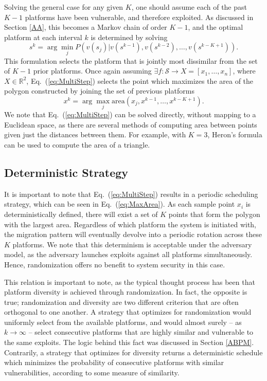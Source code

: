 \documentclass{acm_proc_article-sp}
\begin{document}
Solving the general case for any given $K$, one should assume each of the past $K-1$ platforms have been vulnerable, and therefore exploited. As discussed in Section \ref{AA}, this becomes a Markov chain of order $K-1$, and the optimal platform at each interval $k$ is determined by solving
\begin{equation}
s^k=\arg\min_{j}P\left(v(s_{j})|v(s^{k-1}),v(s^{k-2}),\ldots,v(s^{k-K+1})\right).\label{eq:MultiStep}
\end{equation}
This formulation selects the platform that is jointly most dissimilar from the set of $K-1$ prior platforms. Once again assuming $\exists f:\mathcal{S}\rightarrow X=[x_{1},\ldots,x_{n}]$, where $X\in\mathbb{R}^{2}$, Eq.\ (\ref{eq:MultiStep}) selects the point which maximizes the area of the polygon constructed by joining the set of previous platforms
\begin{equation}
x^k=\arg\max_{j}\textrm{area}(x_{j},x^{k-1},\ldots,x^{k-K+1}).\label{eq:MaxArea}
\end{equation}
We note that Eq.\ (\ref{eq:MultiStep}) can be solved directly, without mapping to a Euclidean space, as there are several methods of computing area between points given just the distances between them. For example, with $K=3$, Heron's formula can be used to compute the area of a triangle.


\subsection{Deterministic Strategy}

It is important to note that Eq.\ (\ref{eq:MultiStep}) results in a periodic scheduling strategy, which can be seen in Eq.\ (\ref{eq:MaxArea}). As each sample point $x_{i}$ is deterministically defined, there will exist a set of $K$ points that form the polygon with the largest area. Regardless of which platform the system is initiated with, the migration pattern will eventually devolve into a periodic rotation across these $K$ platforms. We note that this determinism is acceptable under the adversary model, as the adversary launches exploits against all platforms simultaneously. Hence, randomization offers no benefit to system security in this case.

This relation is important to note, as the typical thought process has been that platform diversity is achieved through randomization. In fact, the opposite is true; randomization and diversity are two
different criterion that are often orthogonal to one another. A strategy that optimizes for randomization would uniformly select from the available platforms, and would almost surely -- as $k\rightarrow\infty$ -- select consecutive platforms that are highly similar and vulnerable to the same exploits. The logic behind this fact was discussed in Section \ref{ABPM}. Contrarily, a strategy that optimizes for diversity returns a deterministic schedule which minimizes the probability of consecutive platforms with similar vulnerabilities, according to some measure of similarity.
\end{document}
